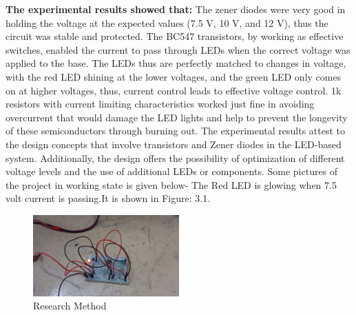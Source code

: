 \textbf{The experimental results showed that:}
The zener diodes were very good in holding the voltage at the expected values (7.5 V, 10 V, and 12 V), thus the circuit was stable and protected.
The BC547 transistors, by working as effective switches, enabled the current to pass through LEDs when the correct voltage was applied to the base.
The LEDs thus are perfectly matched to changes in voltage, with the red LED shining at the lower voltages, and the green LED only comes on at higher voltages, thus, current control leads to effective voltage control.
1k resistors with current limiting characteristics worked just fine in avoiding overcurrent that would damage the LED lights and help to prevent the longevity of these semiconductors through burning out.
The experimental results attest to the design concepts that involve transistors and Zener diodes in the LED-based system. Additionally, the design offers the possibility of optimization of different voltage levels and the use of additional LEDs or components.\cite{b16} Some pictures of the project in working state is given below-
\newline
The Red LED is glowing when 7.5 volt current is passing.It is shown in Figure: 3.1.
\begin{figure}[h!] %
    \centering
    \includegraphics[width=0.5\textwidth]{10.png} %
    \caption{Research Method}
    \label{fig:sample}
\end{figure}

